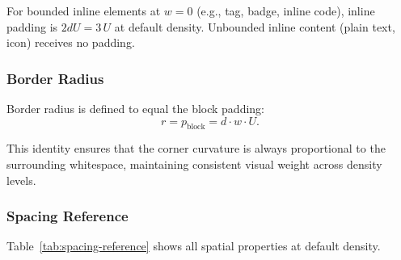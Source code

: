 For bounded inline elements at $w = 0$ (e.g., tag, badge, inline code), inline padding is $2dU = 3\,U$ at default density. Unbounded inline content (plain text, icon) receives no padding.

\subsubsection{Border Radius}

Border radius is defined to equal the block padding:
\begin{equation}
r = p_{\text{block}} = d \cdot w \cdot U.
\end{equation}

This identity ensures that the corner curvature is always proportional to the surrounding whitespace, maintaining consistent visual weight across density levels.

\subsubsection{Spacing Reference}

Table~\ref{tab:spacing-reference} shows all spatial properties at default density.


